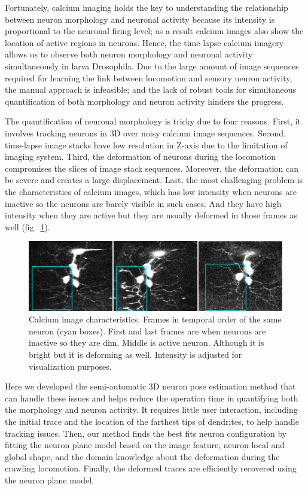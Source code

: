 \documentclass[10pt,letterpaper]{article}
\begin{document}
Fortunately, calcium imaging holds the key to understanding the relationship between neuron morphology and neuronal activity because its intensity is proportional to the neuronal firing level; as a result calcium images also show the location of active regions in neurons. Hence, the time-lapse calcium imagery allows us to observe both neuron morphology and neuronal activity simultaneously in larva Drosophila. Due to the large amount of image sequences required for learning the link between locomotion and sensory neuron activity, the manual approach is infeasible; and the lack of robust tools for simultaneous quantification of both morphology and neuron activity hinders the progress.

The quantification of neuronal morphology is tricky due to four reasons. First, it involves tracking neurons in 3D over noisy calcium image sequences. Second, time-lapse image stacks have low resolution in Z-axis due to the limitation of imaging system. Third, the deformation of neurons during the locomotion compromises the slices of image stack sequences. Moreover, the deformation can be severe and creates a large displacement. Last, the most challenging problem is the characteristics of calcium images, which has low intensity when neurons are inactive so the neurons are barely visible in such cases. And they have high intensity when they are active but they are usually deformed in those frames as well (fig.~\ref{fig:calcium_img}).

\begin{figure}
	\centering
	\includegraphics[width=0.7\linewidth]{img/calcium_img}
	\caption{Calcium image characteristics. Frames in temporal order of the same neuron (cyan boxes). First and last frames are when neurons are inactive so they are dim. Middle is active neuron. Although it is bright but it is deforming as well. Intensity is adjusted for visualization purposes.}
	\label{fig:calcium_img}
\end{figure}

Here we developed the semi-automatic 3D neuron pose estimation method that can handle these issues and helps reduce the operation time in quantifying both the morphology and neuron activity. It requires little user interaction, including the initial trace and the location of the farthest tips of dendrites, to help handle tracking issues. Then, our method finds the best fits neuron configuration by fitting the neuron plane model based on the image feature, neuron local and global shape, and the domain knowledge about the deformation during the crawling locomotion. Finally, the deformed traces are efficiently recovered using the neuron plane model.
\end{document}
